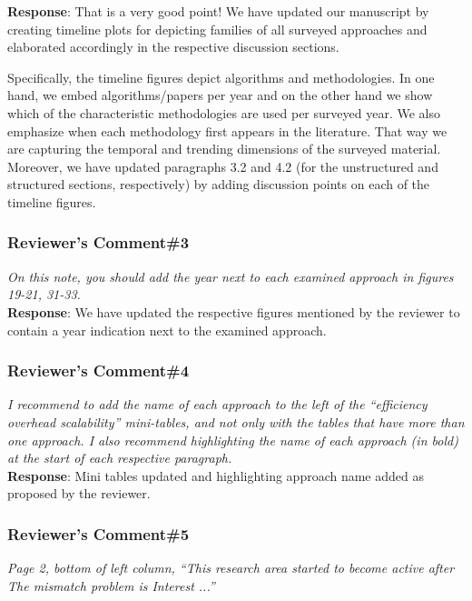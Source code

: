 \documentclass[10pt,letterpaper]{article}
\begin{document}
\noindent
\textbf{\textsf{Response}}:
That is a very good point! 
We have updated our manuscript by
creating timeline plots for depicting families of all surveyed approaches 
and elaborated accordingly
in the respective discussion sections.

Specifically, the timeline figures depict algorithms and methodologies. In one hand, we embed
algorithms/papers per year and on the other hand we show which of the characteristic methodologies
are used per surveyed year. We also emphasize when each methodology first appears in the
literature. That way we are capturing the temporal and trending dimensions of the
surveyed material. Moreover, we have updated paragraphs 3.2 and 4.2 (for the unstructured
and structured sections, respectively) by adding discussion points on each of the timeline figures.

\baselineskip

\subsubsection*{\textbf{\textsf{Reviewer's Comment\#3}}}
\noindent
\emph{On this note, you should add the year next to each examined approach in figures 19-21, 31-33.}\\[6pt]

\noindent
\textbf{\textsf{Response}}:
We have updated the respective figures mentioned by the reviewer to contain a year indication
next to the examined approach.


\subsubsection*{\textbf{\textsf{Reviewer's Comment\#4}}}
\noindent
\emph{I recommend to add the name of each approach to the left of the
``efficiency overhead scalability'' mini-tables, and not only with the tables that have
more than one approach. I also recommend highlighting the name of each approach (in bold)
at the start of each respective paragraph.}\\[6pt]

\noindent
\textbf{\textsf{Response}}:
Mini tables updated and highlighting approach name added as proposed by the reviewer.


\subsubsection*{\textbf{\textsf{Reviewer's Comment\#5}}}
\noindent
\emph{Page 2, bottom of left column, ``This research area started to become active after The mismatch problem is Interest ...''}\\[6pt]
\end{document}
